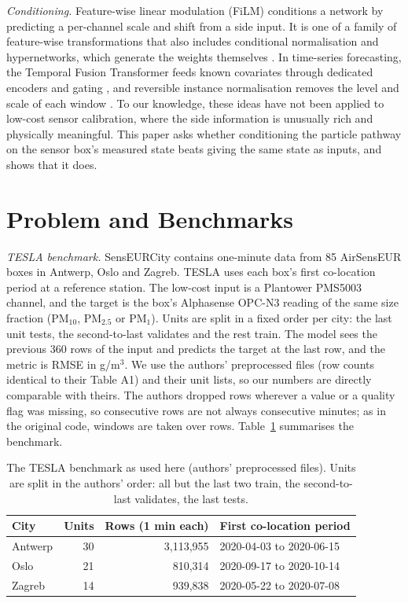 \documentclass[journal]{IEEEtran}
\newcommand{\PMten}{PM$_{10}$}
\newcommand{\PMtwo}{PM$_{2.5}$}
\newcommand{\PMone}{PM$_{1}$}
\begin{document}
\textit{Conditioning.} Feature-wise linear modulation (FiLM) \cite{perez2018} conditions a network by predicting a
per-channel scale and shift from a side input. It is one of a family of feature-wise transformations
\cite{dumoulin2018} that also includes conditional normalisation \cite{devries2017} and hypernetworks, which generate
the weights themselves \cite{ha2017}. In time-series forecasting, the Temporal Fusion Transformer feeds known
covariates through dedicated encoders and gating \cite{lim2021}, and reversible instance normalisation removes the
level and scale of each window \cite{kim2022}. To our knowledge, these ideas have not been applied to low-cost sensor calibration, where
the side information is unusually rich and physically meaningful. This paper asks whether conditioning the particle
pathway on the sensor box's measured state beats giving the same state as inputs, and shows that it does.

\section{Problem and Benchmarks}
\label{sec:problem}

\textit{TESLA benchmark.} SensEURCity \cite{vanpoppel2023} contains one-minute data from 85 AirSensEUR boxes in
Antwerp, Oslo and Zagreb. TESLA \cite{ahn2025} uses each box's first co-location period at a reference station. The
low-cost input is a Plantower PMS5003 channel, and the target is the box's Alphasense OPC-N3 reading of the same size
fraction (\PMten, \PMtwo{} or \PMone). Units are split in a fixed order per city: the last unit tests, the
second-to-last validates and the rest train. The model sees the previous 360 rows of the input and predicts the target
at the last row, and the metric is RMSE in \textmu g/m$^3$. We use the authors' preprocessed files (row counts
identical to their Table A1) and their unit lists, so our numbers are directly comparable with theirs. The authors
dropped rows wherever a value or a quality flag was missing, so consecutive rows are not always consecutive minutes; as
in the original code, windows are taken over rows. Table~\ref{tab:data} summarises the benchmark.

\begin{table}[t]
\centering
\caption{The TESLA benchmark as used here (authors' preprocessed files). Units are split in the authors' order: all
but the last two train, the second-to-last validates, the last tests.}
\label{tab:data}
\begin{tabular}{lrrl}
\toprule
City & Units & Rows (1 min each) & First co-location period \\
\midrule
Antwerp & 30 & 3,113,955 & 2020-04-03 to 2020-06-15 \\
Oslo & 21 & 810,314 & 2020-09-17 to 2020-10-14 \\
Zagreb & 14 & 939,838 & 2020-05-22 to 2020-07-08 \\
\bottomrule
\end{tabular}
\end{table}
\end{document}
